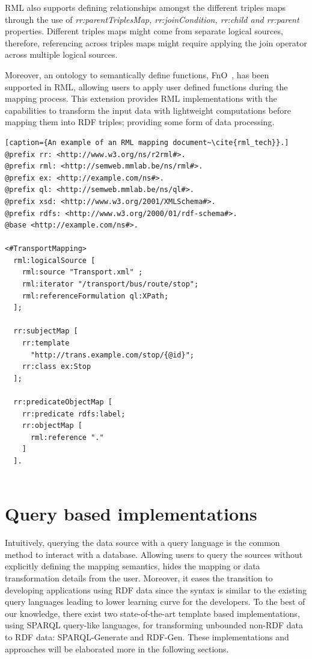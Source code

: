 RML also supports defining relationships amongst the different 
triples maps through the use of \textit{rr:parentTriplesMap, rr:joinCondition, rr:child and rr:parent}
properties. Different triples maps might come from separate logical sources, therefore, 
referencing across triples maps might require applying the join operator across multiple 
logical sources. 

Moreover, an ontology to semantically define functions, FnO~\cite{fno_ben}, has been supported 
in RML, allowing users to apply user defined functions during the mapping process. This 
extension provides RML implementations with the capabilities to transform the input data with 
lightweight computations before mapping them into RDF triples; providing some form of 
data processing. 

\begin{lstlisting}[caption={An example of an RML mapping document~\cite{rml_tech}}.]
@prefix rr: <http://www.w3.org/ns/r2rml#>.
@prefix rml: <http://semweb.mmlab.be/ns/rml#>.
@prefix ex: <http://example.com/ns#>.
@prefix ql: <http://semweb.mmlab.be/ns/ql#>.
@prefix xsd: <http://www.w3.org/2001/XMLSchema#>.
@prefix rdfs: <http://www.w3.org/2000/01/rdf-schema#>.
@base <http://example.com/ns#>.

<#TransportMapping>
  rml:logicalSource [
    rml:source "Transport.xml" ;
    rml:iterator "/transport/bus/route/stop";
    rml:referenceFormulation ql:XPath;
  ];

  rr:subjectMap [
    rr:template
      "http://trans.example.com/stop/{@id}";
    rr:class ex:Stop
  ];

  rr:predicateObjectMap [
    rr:predicate rdfs:label;
    rr:objectMap [
      rml:reference "."
    ]
  ].
    
\end{lstlisting}

\section{Query based implementations}
\label{sec:query_based_implementations}

Intuitively, querying the data source with a 
query language is the common method to interact 
with a database. Allowing users to query the sources without explicitly 
defining the mapping semantics, hides the mapping or data transformation details from the user. 
Moreover, it eases the transition to developing applications using RDF data since the syntax is 
similar to the existing query languages leading to lower learning curve for the developers.
To the best of our knowledge, there exist two state-of-the-art 
template based implementations, using SPARQL query-like languages, for transforming 
unbounded non-RDF data to RDF data: SPARQL-Generate and RDF-Gen.
These implementations and approaches will be elaborated more in the following sections.


